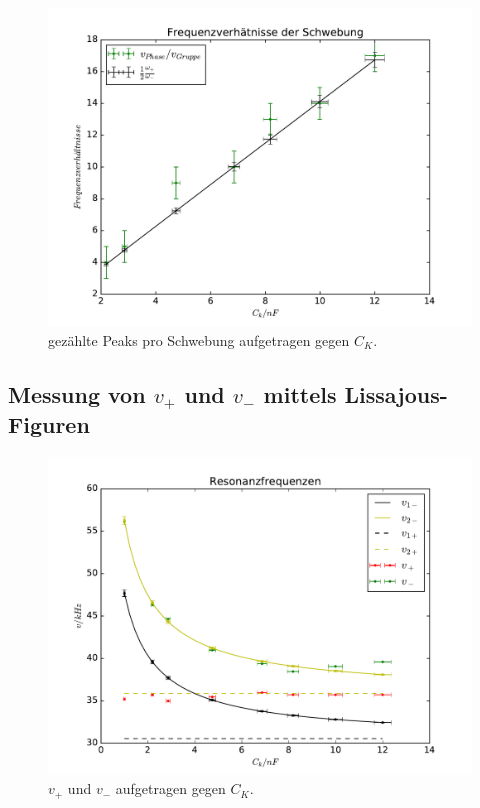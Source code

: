 \begin{figure}
  \centering
  \includegraphics[width=\textwidth]{./plots/freq-ratio.pdf}
  \caption{gezählte Peaks pro Schwebung aufgetragen gegen $C_K$.}
  \label{fig:verhältnisse}
\end{figure}
\FloatBarrier

\subsection{Messung von $v_+$ und $v_-$ mittels Lissajous-Figuren}
\label{sec:Messung-v}


\begin{figure}
  \centering
  \includegraphics[width=\textwidth]{./plots/resonance.pdf}
  \caption{$v_+$ und $v_-$ aufgetragen gegen $C_K$.}
  \label{fig:frequenzen}
\end{figure}
\FloatBarrier

